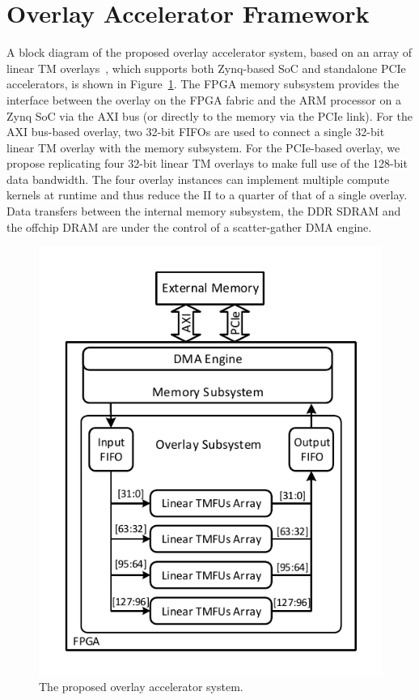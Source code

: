 \section{Overlay Accelerator Framework}
A block diagram of the proposed overlay accelerator system, based on an array of linear TM overlays~\cite{li2018time}, which supports both Zynq-based SoC and standalone PCIe accelerators, is shown in Figure~\ref{system}. 
The FPGA memory subsystem provides the interface between the overlay on the FPGA fabric and the ARM processor on a Zynq SoC via the AXI bus (or directly to the memory via the PCIe link). 
For the AXI bus-based overlay, two 32-bit FIFOs are used to connect a single 32-bit linear TM overlay with the memory subsystem. 
For the PCIe-based overlay, we propose replicating four 32-bit linear TM overlays to make full use of the 128-bit data bandwidth. The four overlay instances can implement multiple compute kernels at runtime and thus reduce the II to a quarter of that of a single overlay.
Data transfers between the internal memory subsystem, the DDR SDRAM and the offchip DRAM are under the control of a scatter-gather DMA engine. 

\begin{figure}[tb]
	\centering
	\includegraphics[width=\columnwidth]{Figures/system_new.pdf}
	\caption{The proposed overlay accelerator system.}
	\label{system}
\end{figure}


